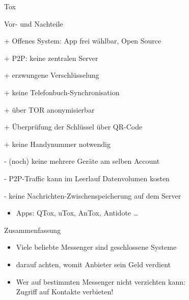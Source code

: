 \begin{frame}{Tox}
\begin{blex}{Vor- und Nachteile}
\item[+] Offenes System: App frei wählbar, Open Source
\item[+] P2P: keine zentralen Server
\item[+] erzwungene Verschlüsselung
\item[+] keine Telefonbuch-Synchronisation
\item[+] über TOR anonymisierbar
\item[+] Überprüfung der Schlüssel über QR-Code
\item[+] keine Handynummer notwendig
\item[-] (noch) keine mehrere Geräte am selben Account
\item[-] P2P-Traffic kann im Leerlauf Datenvolumen kosten
\item[-] keine Nachrichten-Zwischenspeicherung auf dem Server
\begin{itemize}
  \item    Apps: QTox, uTox, AnTox, Antidote  \ldots
\end{itemize}
\end{blex}
\end{frame}

\begin{frame}{Zusammenfassung}
  \begin{itemize}
    \item Viele beliebte Messenger sind geschlossene Systeme
    \item darauf achten, womit Anbieter sein Geld verdient
    \item Wer auf bestimmten Messenger nicht verzichten kann:\\Zugriff auf Kontakte verbieten!
  \end{itemize}
\end{frame}

